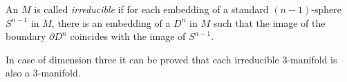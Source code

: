 \documentclass[12pt]{article}
\begin{document}
An  $M$ is called
\emph{irreducible} if for each embedding of a standard $(n-1)$-sphere $S^{n-1}$ in
$M$, there is an embedding of a  $D^n$ in $M$ such that the
image of the boundary $\partial D^n$ coincides with the image of
$S^{n-1}$.

In case of dimension three it can be proved that each irreducible
3-manifold is also a  3-manifold.

\end{document}
